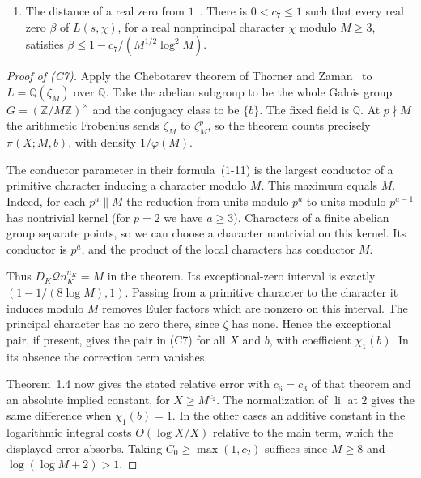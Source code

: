 \begin{enumerate}
\[
\big\lvert\pi(X;M,b)-\mathfrak m(X;M,b)\big\rvert\le A_0'\Big(e^{-c_6\log X/\log M}+e^{-\sqrt{c_6\log X}}\Big)\,\mathfrak m(X;M,b),
\]
where $\mathfrak m(X;M,b)=\big(\operatorname{li}(X)-\chi_1(b)\operatorname{li}(X^{\beta_1})\big)/\varphi(M)$ for the chosen pair, and $\mathfrak m(X;M,b)=\operatorname{li}(X)/\varphi(M)$ when no such pair exists.
\item[(C8)] The distance of a real zero from $1$~\cite[Ch.~14]{davenport}. There is $0<c_7\le1$ such that every real zero $\beta$ of $L(s,\chi)$, for a real nonprincipal character $\chi$ modulo $M\ge3$, satisfies $\beta\le1-c_7/(M^{1/2}\log^2M)$.
\end{enumerate}

\begin{proof}[Proof of (C7)]
Apply the Chebotarev theorem of Thorner and Zaman~\cite[Theorem~1.4]{thornerzaman19}
to $L=\mathbb Q(\zeta_M)$ over $\mathbb Q$. Take the abelian subgroup to be the
whole Galois group $G=(\mathbb Z/M\mathbb Z)^\times$ and the conjugacy class
to be $\{b\}$. The fixed field is $\mathbb Q$. At $p\nmid M$ the arithmetic
Frobenius sends $\zeta_M$ to $\zeta_M^p$, so the theorem counts precisely
$\pi(X;M,b)$, with density $1/\varphi(M)$.

The conductor parameter in their formula~(1-11) is the largest conductor
of a primitive character inducing a character modulo $M$. This maximum
equals $M$. Indeed, for each $p^a\parallel M$ the reduction from units
modulo $p^a$ to units modulo $p^{a-1}$ has nontrivial kernel
(for $p=2$ we have $a\ge3$). Characters of a finite abelian group separate
points, so we can choose a character nontrivial on this kernel. Its conductor
is $p^a$, and the product of the local characters has conductor $M$.

Thus $D_K\mathcal Q n_K^{n_K}=M$ in the theorem. Its exceptional-zero
interval is exactly $(1-1/(8\log M),1)$. Passing from a primitive character
to the character it induces modulo $M$ removes Euler factors which are
nonzero on this interval. The principal character has no zero there, since
$\zeta$ has none. Hence the exceptional pair, if present, gives the pair
in (C7) for all $X$ and $b$, with coefficient $\chi_1(b)$. In its absence
the correction term vanishes.

Theorem~1.4 now gives the stated relative error with $c_6=c_3$ of that
theorem and an absolute implied constant, for $X\ge M^{c_2}$.
The normalization of $\operatorname{li}$ at $2$ gives the same difference
when $\chi_1(b)=1$. In the other cases an additive constant in the
logarithmic integral costs $O(\log X/X)$ relative to the main term,
which the displayed error absorbs. Taking $C_0\ge\max(1,c_2)$ suffices
since $M\ge8$ and $\log(\log M+2)>1$.
\end{proof}


